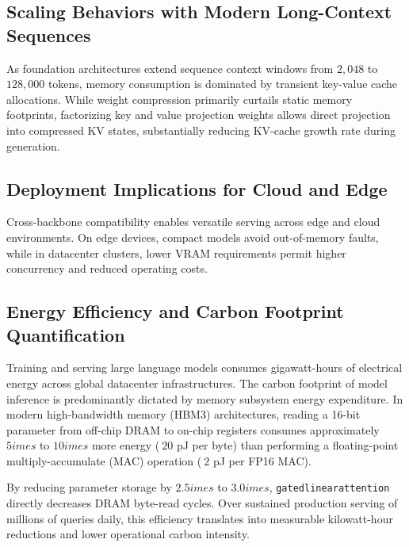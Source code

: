 \subsection{Scaling Behaviors with Modern Long-Context Sequences}
As foundation architectures extend sequence context windows from $2{,}048$ to $128{,}000$ tokens, memory consumption is dominated by transient key-value cache allocations. While weight compression primarily curtails static memory footprints, factorizing key and value projection weights allows direct projection into compressed KV states, substantially reducing KV-cache growth rate during generation.

\subsection{Deployment Implications for Cloud and Edge}
Cross-backbone compatibility enables versatile serving across edge and cloud environments. On edge devices, compact models avoid out-of-memory faults, while in datacenter clusters, lower VRAM requirements permit higher concurrency and reduced operating costs.

\subsection{Energy Efficiency and Carbon Footprint Quantification}
Training and serving large language models consumes gigawatt-hours of electrical energy across global datacenter infrastructures. The carbon footprint of model inference is predominantly dictated by memory subsystem energy expenditure. In modern high-bandwidth memory (HBM3) architectures, reading a 16-bit parameter from off-chip DRAM to on-chip registers consumes approximately $5	imes$ to $10	imes$ more energy ($~20$ pJ per byte) than performing a floating-point multiply-accumulate (MAC) operation ($~2$ pJ per FP16 MAC).

By reducing parameter storage by $2.5	imes$ to $3.0	imes$, \texttt{gatedlinearattention} directly decreases DRAM byte-read cycles. Over sustained production serving of millions of queries daily, this efficiency translates into measurable kilowatt-hour reductions and lower operational carbon intensity.
